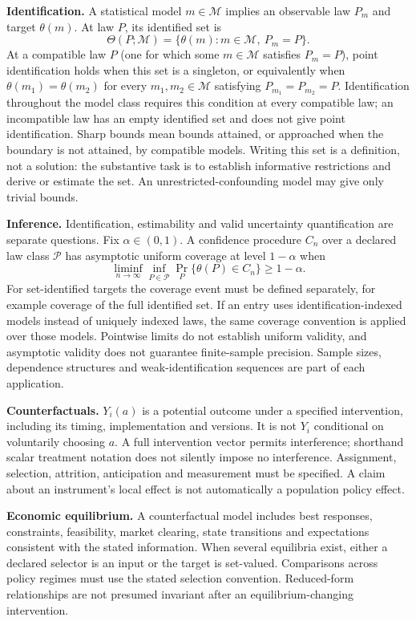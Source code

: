 \documentclass[11pt,a4paper]{article}
\begin{document}
\textbf{Identification.} A statistical model $m\in\mathcal M$ implies an observable law $P_m$ and target $\theta(m)$. At law $P$, its identified set is
\[
\Theta(P;\mathcal M)=\{\theta(m):m\in\mathcal M,\ P_m=P\}.
\]
At a compatible law $P$ (one for which some $m\in\mathcal M$ satisfies $P_m=P$), point identification holds when this set is a singleton, or equivalently when $\theta(m_1)=\theta(m_2)$ for every $m_1,m_2\in\mathcal M$ satisfying $P_{m_1}=P_{m_2}=P$. Identification throughout the model class requires this condition at every compatible law; an incompatible law has an empty identified set and does not give point identification. Sharp bounds mean bounds attained, or approached when the boundary is not attained, by compatible models. Writing this set is a definition, not a solution: the substantive task is to establish informative restrictions and derive or estimate the set. An unrestricted-confounding model may give only trivial bounds.

\textbf{Inference.} Identification, estimability and valid uncertainty quantification are separate questions. Fix $\alpha\in(0,1)$. A confidence procedure $C_n$ over a declared law class $\mathcal P$ has asymptotic uniform coverage at level $1-\alpha$ when
\[
\liminf_{n\to\infty}\inf_{P\in\mathcal P}\Pr_P\{\theta(P)\in C_n\}\geq1-\alpha.
\]
For set-identified targets the coverage event must be defined separately, for example coverage of the full identified set. If an entry uses identification-indexed models instead of uniquely indexed laws, the same coverage convention is applied over those models. Pointwise limits do not establish uniform validity, and asymptotic validity does not guarantee finite-sample precision. Sample sizes, dependence structures and weak-identification sequences are part of each application.

\textbf{Counterfactuals.} $Y_i(a)$ is a potential outcome under a specified intervention, including its timing, implementation and versions. It is not $Y_i$ conditional on voluntarily choosing $a$. A full intervention vector permits interference; shorthand scalar treatment notation does not silently impose no interference. Assignment, selection, attrition, anticipation and measurement must be specified. A claim about an instrument's local effect is not automatically a population policy effect.

\textbf{Economic equilibrium.} A counterfactual model includes best responses, constraints, feasibility, market clearing, state transitions and expectations consistent with the stated information. When several equilibria exist, either a declared selector is an input or the target is set-valued. Comparisons across policy regimes must use the stated selection convention. Reduced-form relationships are not presumed invariant after an equilibrium-changing intervention.
\end{document}
